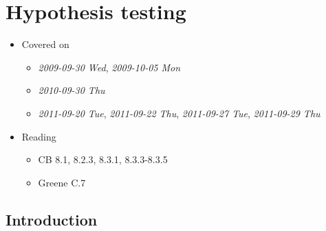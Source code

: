 
\chapter{Hypothesis testing}

\begin{itemize}
\item Covered on
\begin{itemize}
\item \textit{2009-09-30 Wed}, \textit{2009-10-05 Mon}
\item \textit{2010-09-30 Thu}
\item \textit{2011-09-20 Tue}, \textit{2011-09-22 Thu}, \textit{2011-09-27 Tue},
       \textit{2011-09-29 Thu}
\end{itemize}
\item Reading
\begin{itemize}
\item CB 8.1, 8.2.3, 8.3.1, 8.3.3-8.3.5
\item Greene C.7
\end{itemize}
\end{itemize}
\section{Introduction}
\label{sec-1}

